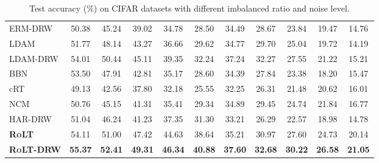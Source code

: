 \documentclass{article}
\def\algo{{\textsc{RoLT}}}
\begin{document}
\begin{table}[h]
\begin{center}
\begin{tabular}{ l | c c c c c | c c c c c  }
ERM-DRW  &  50.38  &  45.24  &  39.02  &  34.78  &  28.50   &  34.49  &  28.67  &  23.84  &  19.47  &  14.76  \\
LDAM  &  51.77  &  48.14  &  43.27  &  36.66  &  29.62   &  34.77  &  29.70  &  25.04  &  19.72  &  14.19  \\
LDAM-DRW  &  54.01  &  50.44  &  45.11  &  39.35  &  32.24   &  37.24  &  32.27  &  27.55  &  21.22  &  15.21  \\
BBN  &  53.50  &  47.91  &  42.81  &  35.17  &  28.60   &  34.39  &  27.84  &  23.38  &  18.20  &  15.47  \\
cRT  &  49.13  &  42.56  &  37.80  &  32.18  &  25.55   &  32.25  &  26.31  &  21.48  &  20.62  &  16.01  \\
NCM  &  50.76  &  45.15  &  41.31  &  35.41  &  29.34   &  34.89  &  29.45  &  24.74  &  21.84  &  16.77  \\
HAR-DRW  & 51.04 & 46.24 & 41.23 & 37.35 & 31.30  & 33.21 & 26.29 & 22.57 & 18.98 & 14.78 \\
\midrule
\textbf{\algo} & 54.11 & 51.00 & 47.42 & 44.63 & 38.64  & 35.21 & 30.97 & 27.60 & 24.73 & 20.14 \\
\textbf{\algo-DRW}  &\bf 55.37 &\bf 52.41 &\bf 49.31 &\bf 46.34 &\bf 40.88  &\bf 37.60 &\bf 32.68 &\bf 30.22 &\bf 26.58 &\bf 21.05 \\
\bottomrule
\end{tabular}
\end{center}
\caption{ Test accuracy (\%) on CIFAR datasets with different imbalanced ratio and noise level. }\label{tab:cifar}
\end{table}

\vspace{-0.4cm}
\end{document}
